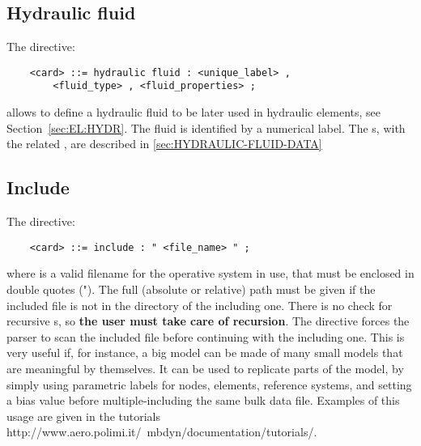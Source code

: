 \subsection{Hydraulic fluid}\label{sec:HYDRAULIC-FLUID}
The  directive:
\begin{verbatim}
    <card> ::= hydraulic fluid : <unique_label> , 
        <fluid_type> , <fluid_properties> ;
\end{verbatim}
allows to define a hydraulic fluid to be later used in hydraulic elements,
see Section~\ref{sec:EL:HYDR}.
The fluid is identified by a numerical label. 
The s, with the related , are
described in \ref{sec:HYDRAULIC-FLUID-DATA}



\subsection{Include}
The  directive:
\begin{verbatim}
    <card> ::= include : " <file_name> " ;
\end{verbatim}
where  is a valid filename for the operative system in
use, that must be enclosed in double quotes (").
The full (absolute or relative) path must be given if the included file 
is not in the directory of the including one.
There is no check for recursive s, so 
{\bf the user must take care of recursion}.
The  directive forces the parser to scan the included file
 before continuing with the including one.
This is very useful if, for instance, a big model can be made of many
small models that are meaningful by themselves.
It can be used to replicate parts of the model, by simply using parametric 
labels for nodes, elements, reference systems, and setting a bias value 
before multiple-including the same bulk data file.
Examples of this usage are given in the tutorials
	{http://www.aero.polimi.it/~mbdyn/documentation/tutorials/}.




